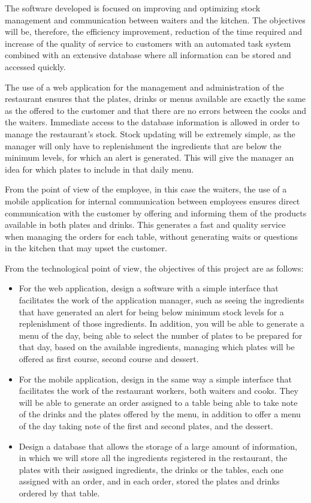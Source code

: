 The software developed is focused on improving and optimizing stock management and communication between waiters and the kitchen. The objectives will be, therefore, the efficiency improvement, reduction of the time required and increase of the quality of service to customers with an automated task system combined with an extensive database  where all information can be stored and accessed quickly.

The use of a web application for the management and administration of the restaurant ensures that the plates, drinks or menus available are exactly the same as the offered to the customer and that there are no errors between the cooks and the waiters. Immediate access to the database information is allowed in order to manage the restaurant's stock. Stock updating will be extremely simple, as the manager will only have to replenishment the ingredients that are below the minimum levels, for which an alert is generated. This will give the manager an idea for which plates to include in that daily menu.

From the point of view of the employee, in this case the waiters, the use of a mobile application for internal communication between employees ensures direct communication with the customer by offering and informing them of the products available in both plates and drinks. This generates a fast and quality service when managing the orders for each table, without generating waits or questions in the kitchen that may upset the customer.

From the technological point of view, the objectives of this project are as follows:

\begin{itemize}

\item For the web application, design a software with a simple interface that facilitates the work of the application manager, such as seeing the ingredients that have generated an alert for being below minimum stock levels for a replenishment of those ingredients. In addition, you will be able to generate a
menu of the day, being able to select the number of plates to be prepared for that day, based on the available ingredients, managing which plates will be offered as first course, second course and dessert.

\item For the mobile application, design in the same way a simple  interface that facilitates the work of the restaurant workers, both waiters and cooks. They will be able to generate an order assigned to a table being able to take note of the drinks and the plates offered by the menu, in addition to offer a menu of the day taking note of the first and second plates, and the dessert.

\item Design a database that allows the storage of a large amount of information, in which we will store all the ingredients registered in the restaurant, the plates with their assigned ingredients, the drinks or the tables, each one assigned with an order, and in each order, stored the plates and drinks ordered by that table.

\end{itemize}


